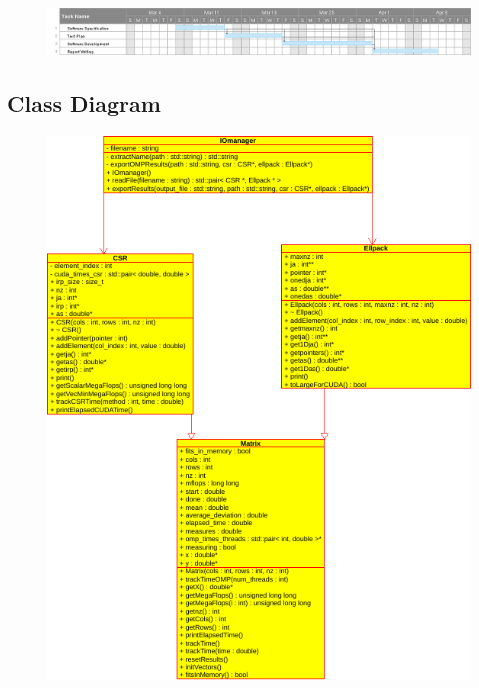 \documentclass[12pt]{article}
\begin{document}
\begin{figure}[!htb]
\centering
\includegraphics[width=1.0\linewidth]{pp.png}
\end{figure}


\pagebreak

\subsection*{Class Diagram}

\begin{figure}[!htb]
\centering
\includegraphics[height=1.2\linewidth]{class_diagram.png}
\end{figure}
\end{document}
